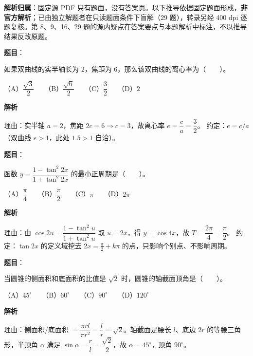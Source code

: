 

\begin{gknotice}
\textbf{解析归属}：固定源 PDF 只有题面，没有答案页。以下推导依据固定题面形成，\textbf{非官方解析}；已由独立解题者在只读题面条件下盲解（29 题），转录另经 400 dpi 逐题复核。第 8、9、16、29 题的源内疑点在答案要点与本题解析中标注，不以推导结果反改原题。
\end{gknotice}

\begin{answer}

\textbf{题目}：

如果双曲线的实半轴长为 $2$，焦距为 $6$，那么该双曲线的离心率为\mbox{（　　）}。

（A）$\dfrac{\sqrt3}{2}$　　（B）$\dfrac{\sqrt6}{2}$　　（C）$\dfrac32$　　（D）$2$

\textbf{解析}

理由：实半轴 $a=2$，焦距 $2c=6\Rightarrow c=3$，故离心率 $e=\dfrac ca=\dfrac32$。
约定：$e=c/a$（双曲线 $e>1$，此处 $1.5>1$ 自洽）。


\end{answer}
\begin{answer}

\textbf{题目}：

函数 $y=\dfrac{1-\tan^2 2x}{1+\tan^2 2x}$ 的最小正周期是\mbox{（　　）}。

（A）$\dfrac\pi4$　　（B）$\dfrac\pi2$　　（C）$\pi$　　（D）$2\pi$

\textbf{解析}

理由：由 $\cos2u=\dfrac{1-\tan^2u}{1+\tan^2u}$ 取 $u=2x$，得 $y=\cos4x$，故 $T=\dfrac{2\pi}{4}=\dfrac\pi2$。
约定：$\tan2x$ 的定义域挖去 $2x=\frac\pi2+k\pi$ 的点，只影响个别点、不影响周期。


\end{answer}
\begin{answer}

\textbf{题目}：

当圆锥的侧面积和底面积的比值是 $\sqrt2$ 时，圆锥的轴截面顶角是\mbox{（　　）}。

（A）$45^\circ$　　（B）$60^\circ$　　（C）$90^\circ$　　（D）$120^\circ$

\textbf{解析}

理由：侧面积/底面积 $=\dfrac{\pi rl}{\pi r^2}=\dfrac lr=\sqrt2$。轴截面是腰长 $l$、底边 $2r$ 的等腰三角形，半顶角 $\alpha$ 满足 $\sin\alpha=\dfrac rl=\dfrac{\sqrt2}{2}$，故 $\alpha=45^\circ$，顶角 $90^\circ$。


\end{answer}
